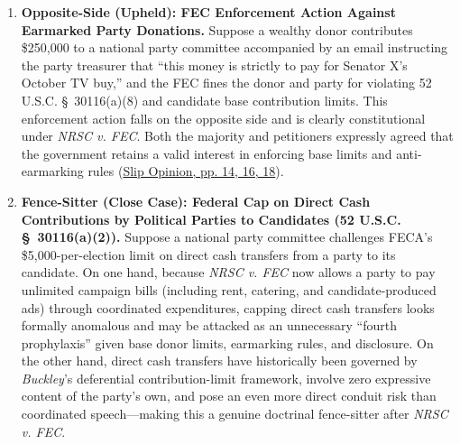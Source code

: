 \documentclass[12pt]{article}
\begin{document}
\begin{enumerate}
\item \textbf{Opposite-Side (Upheld): FEC Enforcement Action Against Earmarked Party Donations.} Suppose a wealthy donor contributes \$250,000 to a national party committee accompanied by an email instructing the party treasurer that ``this money is strictly to pay for Senator X's October TV buy,'' and the FEC fines the donor and party for violating 52 U.S.C. \S~30116(a)(8) and candidate base contribution limits. This enforcement action falls on the opposite side and is clearly constitutional under \textit{NRSC v. FEC}. Both the majority and petitioners expressly agreed that the government retains a valid interest in enforcing base limits and anti-earmarking rules (\href{https://www.supremecourt.gov/opinions/25pdf/24-621_h315.pdf}{Slip Opinion, pp. 14, 16, 18}).

\item \textbf{Fence-Sitter (Close Case): Federal Cap on Direct Cash Contributions by Political Parties to Candidates (52 U.S.C. \S~30116(a)(2)).} Suppose a national party committee challenges FECA's \$5,000-per-election limit on direct cash transfers from a party to its candidate. On one hand, because \textit{NRSC v. FEC} now allows a party to pay unlimited campaign bills (including rent, catering, and candidate-produced ads) through coordinated expenditures, capping direct cash transfers looks formally anomalous and may be attacked as an unnecessary ``fourth prophylaxis'' given base donor limits, earmarking rules, and disclosure. On the other hand, direct cash transfers have historically been governed by \textit{Buckley}'s deferential contribution-limit framework, involve zero expressive content of the party's own, and pose an even more direct conduit risk than coordinated speech---making this a genuine doctrinal fence-sitter after \textit{NRSC v. FEC}.
\end{enumerate}
\end{document}
